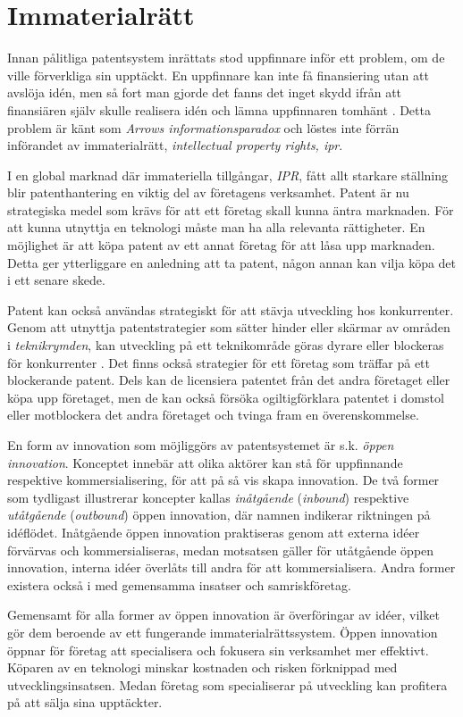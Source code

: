 \section{Immaterialrätt}
\label{sec:ip}

Innan pålitliga patentsystem inrättats stod uppfinnare inför ett problem, om de ville förverkliga sin upptäckt.
En uppfinnare kan inte få finansiering utan att avslöja idén, men så fort man gjorde det fanns det inget skydd ifrån att finansiären själv skulle realisera idén och lämna uppfinnaren tomhänt \cite{nard}.
Detta problem är känt som \emph{Arrows informationsparadox}\cite{arrow} och löstes inte förrän införandet av immaterialrätt, \emph{intellectual property rights, ipr}.

I en global marknad där immateriella tillgångar, \emph{IPR}, fått allt starkare ställning blir patenthantering en viktig del av företagens verksamhet\cite{ove}.
Patent är nu strategiska medel som krävs för att ett företag skall kunna äntra marknaden.
För att kunna utnyttja en teknologi måste man ha alla relevanta rättigheter.
En möjlighet är att köpa patent av ett annat företag för att låsa upp marknaden.
Detta ger ytterliggare en anledning att ta patent, någon annan kan vilja köpa det i ett senare skede.

Patent kan också användas strategiskt för att stävja utveckling hos konkurrenter.
Genom att utnyttja patentstrategier som sätter hinder eller skärmar av områden i \emph{teknikrymden}, kan utveckling på ett teknikområde göras dyrare eller blockeras för konkurrenter \cite{ove}. Det finns också strategier för ett företag som träffar på ett blockerande patent. Dels kan de licensiera patentet från det andra företaget eller köpa upp företaget, men de kan också försöka ogiltigförklara patentet i domstol eller motblockera det andra företaget och tvinga fram en överenskommelse\cite{ove}. 

En form av innovation som möjliggörs av patentsystemet är s.k. \emph{öppen innovation}.
Konceptet innebär att olika aktörer kan stå för uppfinnande respektive kommersialisering, för att på så vis skapa innovation.
De två former som tydligast illustrerar koncepter kallas \emph{inåtgående} (\emph{inbound}) respektive \emph{utåtgående} (\emph{outbound}) öppen innovation, där namnen indikerar riktningen på idéflödet.
Inåtgående öppen innovation praktiseras genom att externa idéer förvärvas och kommersialiseras, medan motsatsen gäller för utåtgående öppen innovation, interna idéer överlåts till andra för att kommersialisera.
Andra former existera också i med gemensamma insatser och samriskföretag.

Gemensamt för alla former av öppen innovation är överföringar av idéer, vilket gör dem beroende av ett fungerande immaterialrättssystem.
Öppen innovation öppnar för företag att specialisera och fokusera sin verksamhet mer effektivt.
Köparen av en teknologi minskar kostnaden och risken förknippad med utvecklingsinsatsen. 
Medan företag som specialiserar på utveckling kan profitera på att sälja sina upptäckter.
